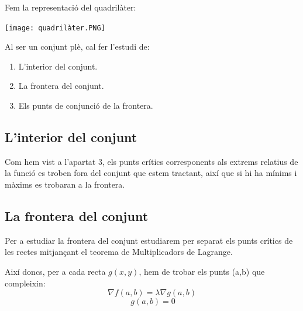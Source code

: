 \documentclass[12pt]{report}
\begin{document}
Fem la representació del quadrilàter:

\begin{center}
    \texttt{[image: quadrilàter.PNG]}
\end{center}


Al ser un conjunt plè, cal fer l'estudi de:
\begin{enumerate}
    \item L'interior del conjunt.
    \item La frontera del conjunt.
    \item Els punts de conjunció de la frontera.
\end{enumerate}

\subsection{L'interior del conjunt}
Com hem vist a l'apartat 3, els punts crítics corresponents als extrems relatius de la funció es troben fora del conjunt que estem tractant, així que si hi ha mínims i màxims es trobaran a la frontera.


\subsection{La frontera del conjunt}
Per a estudiar la frontera del conjunt estudiarem per separat els punts crítics de les rectes mitjançant el teorema de Multiplicadors de Lagrange.
 
Així doncs, per a cada recta $g(x,y)$, hem de trobar els punts (a,b) que compleixin:
\[\nabla f(a,b) = \lambda \nabla g(a,b)\]
\[\ g(a,b) = 0\]
\end{document}
